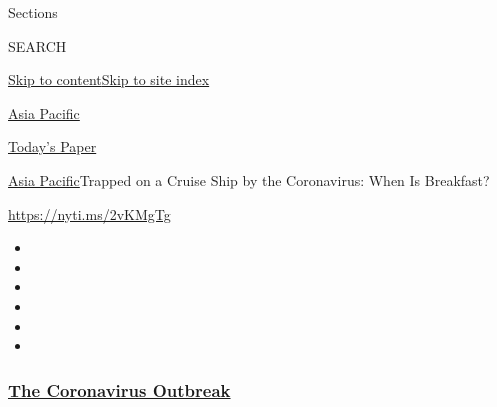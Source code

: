 Sections

SEARCH

\protect\hyperlink{site-content}{Skip to
content}\protect\hyperlink{site-index}{Skip to site index}

\href{https://www.nytimes3xbfgragh.onion/section/world/asia}{Asia
Pacific}

\href{https://myaccount.nytimes3xbfgragh.onion/auth/login?response_type=cookie\&client_id=vi}{}

\href{https://www.nytimes3xbfgragh.onion/section/todayspaper}{Today's
Paper}

\href{/section/world/asia}{Asia Pacific}\textbar{}Trapped on a Cruise
Ship by the Coronavirus: When Is Breakfast?

\url{https://nyti.ms/2vKMgTg}

\begin{itemize}
\item
\item
\item
\item
\item
\item
\end{itemize}

\hypertarget{the-coronavirus-outbreak}{%
\subsubsection{\texorpdfstring{\href{https://www.nytimes3xbfgragh.onion/news-event/coronavirus?name=styln-coronavirus-national\&region=TOP_BANNER\&variant=undefined\&block=storyline_menu_recirc\&action=click\&pgtype=Article\&impression_id=40e9a800-e3b2-11ea-a618-83a5d7d26e11}{The
Coronavirus
Outbreak}}{The Coronavirus Outbreak}}\label{the-coronavirus-outbreak}}

